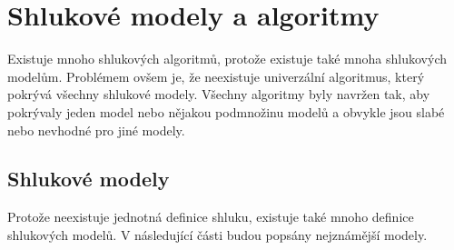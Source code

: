 \section{Shlukové modely a algoritmy} \label{sec:clustermodels}
Existuje mnoho shlukových algoritmů, protože existuje také mnoha shlukových modelům. Problémem ovšem je, že neexistuje univerzální algoritmus, který pokrývá všechny shlukové modely. Všechny algoritmy byly navržen tak, aby pokrývaly jeden model nebo nějakou podmnožinu modelů a obvykle jsou slabé nebo nevhodné pro jiné modely.

\subsection{Shlukové modely}
Protože neexistuje jednotná definice shluku, existuje také mnoho definice shlukových modelů. V následující části budou popsány nejznámější modely.


